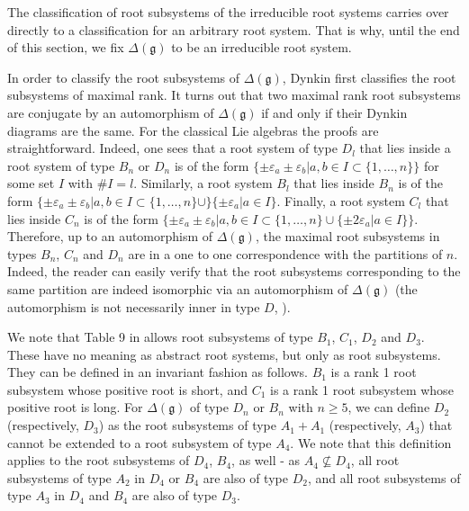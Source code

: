 \documentclass[12pt]{report}
\newcommand{\gG}{\mathfrak{g}}
\newcommand{\eps}{\varepsilon}
\begin{document}
The classification of root subsystems of the irreducible root systems carries over directly to a classification for an arbitrary root system. That is why, until the end of this section, we fix $\Delta(\gG)$ to be an irreducible root system. 

In order to classify the root subsystems of $\Delta(\gG)$, Dynkin first classifies the root subsystems of maximal rank. It turns out that two maximal rank root subsystems are conjugate by an automorphism of $\Delta(\gG)$ if and only if their Dynkin diagrams are the same. For the classical Lie algebras the proofs are straightforward. Indeed, one sees that a root system of type $D_l$ that lies inside a root system of type $B_n$ or $D_n$ is of the form $\{\pm\eps_a\pm\eps_b|a,b\in I\subset \{1,\dots, n\} \}$ for some set $I$ with $\# I=l$. Similarly, a root system $B_l$ that lies inside $B_n$ is of the form $\{\pm\eps_a\pm\eps_b|a,b\in I\subset \{1,\dots, n\}\cup \}\{\pm\eps_a|a\in I\} $. Finally, a root system $C_l$ that lies inside $C_n$ is of the form $\{\pm\eps_a\pm\eps_b|a,b\in I\subset \{1,\dots, n\}\cup \{\pm2\eps_a|a\in I\} \}$. Therefore, up to an automorphism of $\Delta(\gG)$, the maximal root subsystems in types $B_n$, $C_n$ and $D_n$ are in a one to one correspondence with the partitions of $n$. Indeed, the reader can easily verify that the root subsystems corresponding to the same partition are indeed isomorphic via an automorphism of $\Delta(\gG)$ (the automorphism is not necessarily inner in type $D$, \cite{Dynkin:Semisimple}).

We note that Table 9 in \cite{Dynkin:Semisimple} allows root subsystems of type $B_1$, $C_1$, $D_2$ and $D_3$. These have no meaning as abstract root systems, but only as root subsystems. They can be defined in an invariant fashion as follows. $B_1$ is a rank 1 root subsystem whose positive root is short, and $C_1$ is a rank 1 root subsystem whose positive root is long. For $\Delta(\gG)$ of type $D_n$ or $B_n$ with $n\geq 5$, we can define $D_2$ (respectively, $D_3$) as the root subsystems of type $A_1+A_1$ (respectively, $A_3$) that cannot be extended to a root subsystem of type $A_4$. We note that this definition applies to the root subsystems of $D_4$, $B_4$, as well - as $A_4\nsubseteq D_4$, all root subsystems of type $A_2$ in $D_4$ or $B_4$ are also of type $D_2$, and all root subsystems of type $A_3$ in $D_4$ and $B_4$ are also of type $D_3$.
\end{document}
